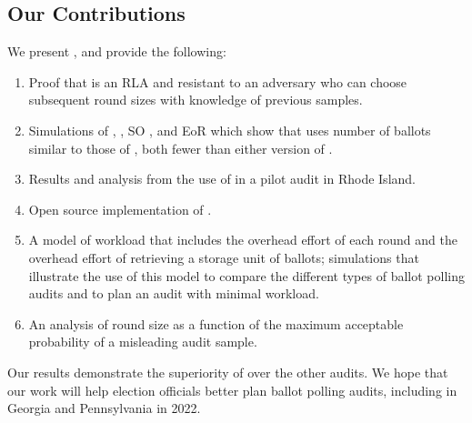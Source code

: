 \subsection{Our Contributions}
We present \Providence, and provide the following:
\begin{enumerate}
\item Proof that \Providence is an RLA and resistant to an adversary who can choose subsequent round sizes with knowledge of previous samples.
\item Simulations of \Providence, \Minerva, SO \BRAVO, and EoR \BRAVO which show that \Providence uses number of ballots similar to those of \Minerva, both fewer than either version of \BRAVO.
\item Results and analysis from the use of \Providence in a pilot audit in Rhode Island.
\item Open source implementation of \Providence. 
\item A model of workload that includes the overhead effort of each round and the overhead effort of retrieving a storage unit of ballots; simulations that illustrate the use of this model to compare the different types of ballot polling audits and to plan an audit with minimal workload.
\item An analysis of round size as a function of the maximum acceptable probability of a misleading audit sample.
\end{enumerate}

Our results demonstrate the superiority of \Providence over the other audits. We hope that our work will help election officials better plan ballot polling audits, including in Georgia and Pennsylvania in 2022. 


